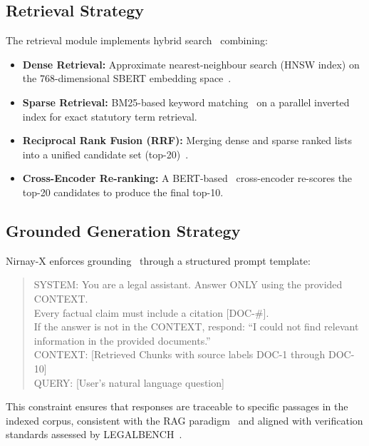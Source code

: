 \documentclass[12pt,a4paper]{article}
\begin{document}
\subsection{Retrieval Strategy}

The retrieval module implements hybrid search~\cite{manning2008ir} combining:
\begin{itemize}[leftmargin=*]
  \item \textbf{Dense Retrieval:} Approximate nearest-neighbour search (HNSW index)
    on the 768-dimensional SBERT embedding space~\cite{reimers2019sbert}.
  \item \textbf{Sparse Retrieval:} BM25-based keyword matching~\cite{manning2008ir}
    on a parallel inverted index for exact statutory term retrieval.
  \item \textbf{Reciprocal Rank Fusion (RRF):} Merging dense and sparse ranked lists
    into a unified candidate set (top-20)~\cite{manning2008ir}.
  \item \textbf{Cross-Encoder Re-ranking:} A BERT-based~\cite{devlin2019bert}
    cross-encoder re-scores the top-20 candidates to produce the final top-10.
\end{itemize}

\subsection{Grounded Generation Strategy}

Nirnay-X enforces grounding~\cite{lewis2020rag} through a structured prompt template:

\begin{quote}\small\ttfamily
SYSTEM: You are a legal assistant. Answer ONLY using the provided CONTEXT.\\
Every factual claim must include a citation [DOC-\#].\\
If the answer is not in the CONTEXT, respond: ``I could not find relevant\\
information in the provided documents.''\\[4pt]
CONTEXT: [Retrieved Chunks with source labels DOC-1 through DOC-10]\\[4pt]
QUERY: [User's natural language question]
\end{quote}

This constraint ensures that responses are traceable to specific passages in the indexed
corpus, consistent with the RAG paradigm~\cite{lewis2020rag} and aligned with
verification standards assessed by LEGALBENCH~\cite{guha2023legalbench}.
\end{document}
